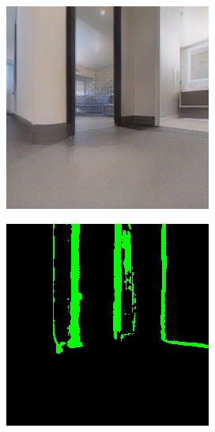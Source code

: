 \begin{figure}[h!]
\begin{subfigure}[b]{\linewidth}
		\caption{}
		\label{fig:wrong_box_1}
	\end{subfigure}
	\newline
	\begin{subfigure}[b]{\linewidth}
		\centering
		\begin{subfigure}[b]{0.32\linewidth}
			\includegraphics[width=\textwidth]{images/wrong_box_rgb_2.png}
		\end{subfigure}
		\hfil
		\begin{subfigure}[b]{0.32\linewidth}
			\includegraphics[width=\textwidth]{images/wrong_box_semantic_2.png}

\end{subfigure}
\end{subfigure}
\end{figure}
